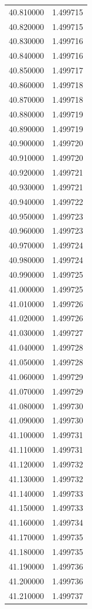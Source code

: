 \begin{tabular}{rr}
40.810000 & 1.499715 \\
40.820000 & 1.499715 \\
40.830000 & 1.499716 \\
40.840000 & 1.499716 \\
40.850000 & 1.499717 \\
40.860000 & 1.499718 \\
40.870000 & 1.499718 \\
40.880000 & 1.499719 \\
40.890000 & 1.499719 \\
40.900000 & 1.499720 \\
40.910000 & 1.499720 \\
40.920000 & 1.499721 \\
40.930000 & 1.499721 \\
40.940000 & 1.499722 \\
40.950000 & 1.499723 \\
40.960000 & 1.499723 \\
40.970000 & 1.499724 \\
40.980000 & 1.499724 \\
40.990000 & 1.499725 \\
41.000000 & 1.499725 \\
41.010000 & 1.499726 \\
41.020000 & 1.499726 \\
41.030000 & 1.499727 \\
41.040000 & 1.499728 \\
41.050000 & 1.499728 \\
41.060000 & 1.499729 \\
41.070000 & 1.499729 \\
41.080000 & 1.499730 \\
41.090000 & 1.499730 \\
41.100000 & 1.499731 \\
41.110000 & 1.499731 \\
41.120000 & 1.499732 \\
41.130000 & 1.499732 \\
41.140000 & 1.499733 \\
41.150000 & 1.499733 \\
41.160000 & 1.499734 \\
41.170000 & 1.499735 \\
41.180000 & 1.499735 \\
41.190000 & 1.499736 \\
41.200000 & 1.499736 \\
41.210000 & 1.499737 \\

\end{tabular}
